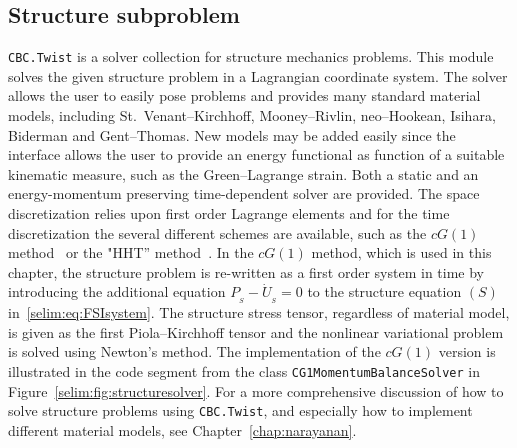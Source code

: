 
\subsection{Structure subproblem}

\texttt{CBC.Twist} is a solver collection for structure mechanics
problems. This module solves the given structure problem in a
Lagrangian coordinate system.  The solver allows the user to easily
pose problems and provides many standard material models, including
St.~Venant--Kirchhoff, Mooney--Rivlin, neo--Hookean, Isihara, Biderman
and Gent--Thomas. New models may be added easily since the interface
allows the user to provide an energy functional as function of a
suitable kinematic measure, such as the Green--Lagrange strain. Both a
static and an energy-momentum preserving time-dependent solver are
provided. The space discretization relies upon first order Lagrange
elements and for the time discretization the several different schemes
are available, such as the $cG(1)$ method~\cite{ErikssonEstepHansboEtAl1996,
  ErikssonEstepJohnson2003} or the "HHT''
method~\cite{HilberHughesTaylor1977}.  In the $cG(1)$ method, which is
used in this chapter, the structure problem is re-written as a first
order system in time by introducing the additional equation $P_{_{S}}
- \dot{U}_{_{S}} = 0$ to the structure equation $(S)$
in~\eqref{selim:eq:FSIsystem}. The structure stress tensor, regardless
of material model, is given as the first Piola--Kirchhoff tensor and
the nonlinear variational problem is solved using Newton's method.
The implementation of the $cG(1)$ version is illustrated in the code
segment from the class \texttt{CG1MomentumBalanceSolver} in
Figure~\ref{selim:fig:structuresolver}. For a more comprehensive
discussion of how to solve structure problems using
\texttt{CBC.Twist}, and especially how to implement different material
models, see Chapter~\ref{chap:narayanan}.


